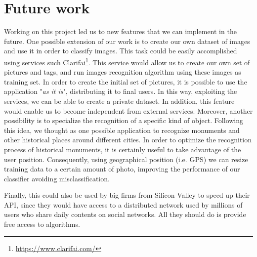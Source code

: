 \section{Future work}
\label{sec:future}

Working on this project led us to new features that we can implement in the 
future.
One possible extension of our work is to create our own dataset of images and 
use it in order to classify images. This task could be easily accomplished using 
services such Clarifai\footnote{\url{https://www.clarifai.com/}}. This service 
would allow us to create our own set of pictures and tags, and run images 
recognition algorithm using these images as training set. In order to create the 
initial set of pictures, it is possible to use the application "\textit{as it 
is}", distributing it to final users. In this way, exploiting the services, we 
can be able to create a private dataset. In addition, this feature would enable 
us to become independent from external services.
Moreover, another possibility is to specialize the recognition of a specific 
kind of object. Following this idea, we thought as one possible application to 
recognize monuments and other historical places around different cities. In 
order to optimize the recognition process of historical monuments, it is 
certainly useful to take advantage of the user position. Consequently, using 
geographical position (i.e. GPS) we can resize training data to a certain amount 
of photo, improving the performance of our classifier avoiding 
misclassification.

Finally, this could also be used by big firms from Silicon Valley to speed up 
their API, since they would have access to a distributed network used by 
millions of users who share daily contents on social networks. All they should 
do is provide free access to algorithms.